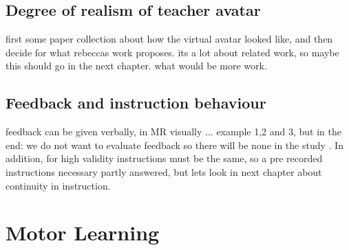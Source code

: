 \subsection{Degree of realism of teacher avatar}
first some paper collection about how the virtual avatar looked like, and then decide for what rebeccas work proposes. its a lot about related work, so maybe this should go in the next chapter. what would be more work. \markAonefourRealism

\subsection{Feedback and instruction behaviour}
feedback \todo can be given verbally, in MR visually ... example 1,2 and 3, but in the end: we do not want to evaluate feedback so there will be none in the study \markAonefiveFeedback. In addition, for high validity instructions must be the same, so a pre recorded instructions necessary \markAelevenBehav partly answered, but lets look in next chapter about continuity in instruction.

\section{Motor Learning}

